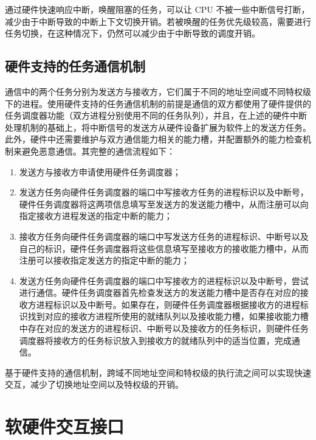 通过硬件快速响应中断，唤醒阻塞的任务，可以让 CPU 不被一些中断信号打断，减少由于中断导致的中断上下文切换开销。若被唤醒的任务优先级较高，需要进行任务切换，在这种情况下，仍然可以减少由于中断导致的调度开销。

\subsection{硬件支持的任务通信机制}

通信中的两个任务分别为发送方与接收方，它们属于不同的地址空间或不同特权级下的进程。使用硬件支持的任务通信机制的前提是通信的双方都使用了硬件提供的任务调度器功能（双方进程分别使用不同的任务队列），并且，在上述的硬件中断处理机制的基础上，将中断信号的发送方从硬件设备扩展为软件上的发送方任务。此外，硬件中还需要维护与双方通信能力相关的能力槽，并配置额外的能力检查机制来避免恶意通信。其完整的通信流程如下：

\begin{enumerate}
    \item 发送方与接收方申请使用硬件任务调度器；

    \item 发送方任务向硬件任务调度器的端口中写接收方任务的进程标识以及中断号，硬件任务调度器将这两项信息填写至发送方的发送能力槽中，从而注册可以向指定接收方进程发送的指定中断的能力；
    
    \item 接收方任务向硬件任务调度器的端口中写发送方任务的进程标识、中断号以及自己的标识，硬件任务调度器将这些信息填写至接收方的接收能力槽中，从而注册可以接收指定发送方的指定中断的能力；
    
    \item 发送方任务向硬件任务调度器的端口中写接收方的进程标识以及中断号，尝试进行通信。硬件任务调度器首先检查发送方的发送能力槽中是否存在对应的接收方进程标识以及中断号。如果存在，则硬件任务调度器根据接收方的进程标识找到对应的接收方进程所使用的就绪队列以及接收能力槽，如果接收能力槽中存在对应的发送方的进程标识、中断号以及接收方的任务标识，则硬件任务调度器将接收方的任务标识放入到接收方的就绪队列中的适当位置，完成通信。

\end{enumerate}

基于硬件支持的通信机制，跨域不同地址空间和特权级的执行流之间可以实现快速交互，减少了切换地址空间以及特权级的开销。

\section{软硬件交互接口}

